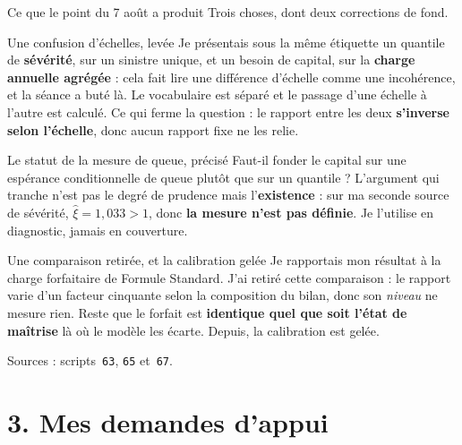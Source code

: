 \documentclass[11pt]{beamer}
\begin{document}
\begin{frame}{Ce que le point du 7 août a produit}
\scriptsize
Trois choses, dont deux corrections de fond.
\vspace{1.5mm}
\begin{block}{Une confusion d'échelles, levée}
Je présentais sous la même étiquette un quantile de \textbf{sévérité}, sur un sinistre unique, et
un besoin de capital, sur la \textbf{charge annuelle agrégée} : cela fait lire une différence
d'échelle comme une incohérence, et la séance a buté là. Le vocabulaire est séparé et le passage
d'une échelle à l'autre est calculé. Ce qui ferme la question : le rapport entre les deux
\textbf{s'inverse selon l'échelle}, donc aucun rapport fixe ne les relie.
\end{block}
\vspace{-1mm}
\begin{block}{Le statut de la mesure de queue, précisé}
Faut-il fonder le capital sur une espérance conditionnelle de queue plutôt que sur un quantile ?
L'argument qui tranche n'est pas le degré de prudence mais l'\textbf{existence} : sur ma seconde
source de sévérité, $\hat\xi = 1{,}033 > 1$, donc \textbf{la mesure n'est pas définie}. Je
l'utilise en diagnostic, jamais en couverture.
\end{block}
\vspace{-1mm}
\begin{block}{Une comparaison retirée, et la calibration gelée}
Je rapportais mon résultat à la charge forfaitaire de Formule Standard. J'ai retiré cette
comparaison : le rapport varie d'un facteur cinquante selon la composition du bilan, donc son
\emph{niveau} ne mesure rien. Reste que le forfait est \textbf{identique quel que soit l'état de
maîtrise} là où le modèle les écarte. Depuis, la calibration est gelée.
\end{block}
\vspace{-1mm}
{\scriptsize Sources : scripts~\texttt{63}, \texttt{65} et~\texttt{67}.}
\end{frame}

\section*{3. Mes demandes d'appui}
\end{document}
